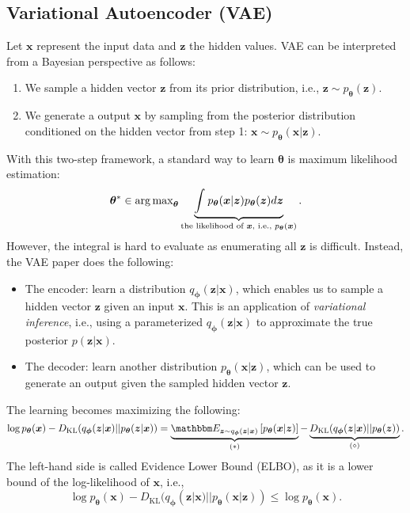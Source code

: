 \subsection{Variational Autoencoder (VAE)}
Let $\bm{x}$ represent the input data and $\bm{z}$ the hidden values. 
VAE can be interpreted from a Bayesian perspective as follows:
    \begin{enumerate}
        \item We sample a hidden vector $\bm{z}$ from its prior distribution, i.e., $\bm{z} \sim p_{\bm{\theta}}(\bm{z})$.
        \item We generate a output $\bm{x}$ by sampling from the posterior distribution conditioned on the hidden vector from step 1:  $\bm{x} \sim p_{\bm{\theta}}(\bm{x} | \bm{z})$.
    \end{enumerate}
With this two-step framework, a standard way to learn $\bm{\theta}$ is maximum likelihood estimation:
    \begin{equation}
        \bm{\theta}^\ast \in \operatorname{arg\,max}_{\bm{\theta}} \underbrace{ \int_{}^{}{p_{  \bm{\theta}}(\bm{x} | \bm{z}) p_{\bm{\theta}}(\bm{z})} d \bm{z} }_{\text{the likelihood of $\bm{x}$, i.e., $p_{\bm{\theta}}(\bm{x})$}}.
    \end{equation}
However, the integral is hard to evaluate as enumerating all $\bm{z}$ is difficult.
Instead, the VAE paper does the following:
    \begin{itemize}
        \item The encoder: learn a distribution $q_{\bm{\phi}}(\bm{z} | \bm{x})$, which enables us to sample a hidden vector $\bm{z}$ given an input $\bm{x}$.
        This is an application of \emph{variational inference}, i.e., using a parameterized $q_{\bm{\phi}}(\bm{z} | \bm{x})$ to approximate the true posterior $p(\bm{z} | \bm{x})$.
        \item The decoder: learn another distribution $p_{\bm{\theta}}(\bm{x} | \bm{z})$, which can be used to generate an output given the sampled hidden vector $\bm{z}$.
    \end{itemize}
The learning becomes maximizing the following:
    \begin{equation}\label{vae:obj}
        \log p_{\bm{\theta}}(\bm{x}) - D_\text{KL}(q_{\bm{\phi}}(\bm{z} | \bm{x}) || p_{\bm{\theta}}(\bm{z} | \bm{x})) = 
        \underbrace{\E_{\bm{z} \sim q_{\bm{\phi}}(\bm{z} | \bm{x})}\left[ p_{\bm{\theta}}(\bm{x} | \bm{z}) \right]}_{(\ast)} - \underbrace{D_\text{KL}(q_{\bm{\phi}}(\bm{z} | \bm{x}) || p_{\bm{\theta}}(\bm{z}))}_{(\diamond)}.
    \end{equation}
The left-hand side is called Evidence Lower Bound (ELBO), as it is a lower bound of the log-likelihood of $\bm{x}$, i.e.,
    \begin{equation}
        \log p_{\bm{\theta}}(\bm{x}) - D_\text{KL}(q_{\bm{\phi}}(\bm{z} | \bm{x})  ||  p_{\bm{\theta}}(\bm{x} | \bm{z})) \le \log p_{\bm{\theta}}(\bm{x}).
    \end{equation}


